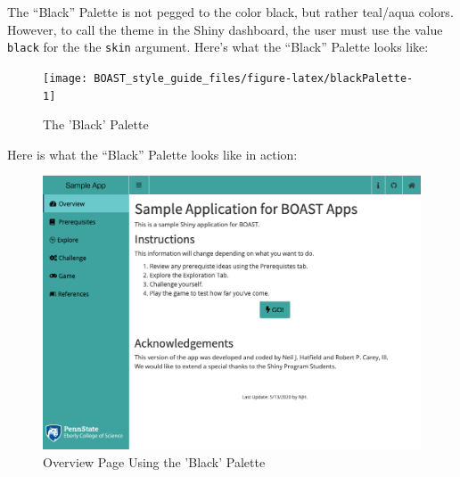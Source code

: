 \documentclass[
]{book}
\begin{document}
The ``Black'' Palette is not pegged to the color black, but rather teal/aqua colors. However, to call the theme in the Shiny dashboard, the user must use the value \texttt{black} for the the \texttt{skin} argument. Here's what the ``Black'' Palette looks like:

\begin{figure}

{\centering \texttt{[image: BOAST\_style\_guide\_files/figure-latex/blackPalette-1]} 

}

\caption{The 'Black' Palette}\label{fig:blackPalette}
\end{figure}

Here is what the ``Black'' Palette looks like in action:

\begin{figure}

{\centering \includegraphics[width=14in]{images/blackOverview} 

}

\caption{Overview Page Using the 'Black' Palette}\label{fig:blackAction1}
\end{figure}
\end{document}
